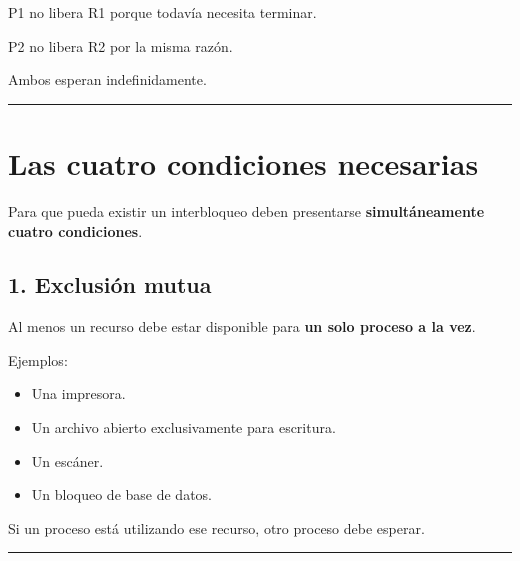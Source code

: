 \documentclass[
  spanish,
  letterpaper,
]{scrbook}
\providecommand{\tightlist}{%
  \setlength{\itemsep}{0pt}\setlength{\parskip}{0pt}}
\begin{document}
\begin{tcolorbox}[enhanced jigsaw, arc=.35mm, bottomrule=.15mm, bottomtitle=1mm, breakable, colback=white, colbacktitle=quarto-callout-warning-color!10!white, colframe=quarto-callout-warning-color-frame, coltitle=black, left=2mm, leftrule=.75mm, opacityback=0, opacitybacktitle=0.6, rightrule=.15mm, title=\textcolor{quarto-callout-warning-color}{\faExclamationTriangle}\hspace{0.5em}{El problema}, titlerule=0mm, toprule=.15mm, toptitle=1mm]

P1 no libera R1 porque todavía necesita terminar.

P2 no libera R2 por la misma razón.

Ambos esperan indefinidamente.

\end{tcolorbox}

\begin{center}\rule{0.5\linewidth}{0.5pt}\end{center}


\chapter{Las cuatro condiciones
necesarias}\label{las-cuatro-condiciones-necesarias}

Para que pueda existir un interbloqueo deben presentarse
\textbf{simultáneamente cuatro condiciones}.

\section{1. Exclusión mutua}\label{exclusiuxf3n-mutua}

Al menos un recurso debe estar disponible para \textbf{un solo proceso a
la vez}.

Ejemplos:

\begin{itemize}
\tightlist
\item
  Una impresora.
\item
  Un archivo abierto exclusivamente para escritura.
\item
  Un escáner.
\item
  Un bloqueo de base de datos.
\end{itemize}

Si un proceso está utilizando ese recurso, otro proceso debe esperar.

\begin{center}\rule{0.5\linewidth}{0.5pt}\end{center}
\end{document}
